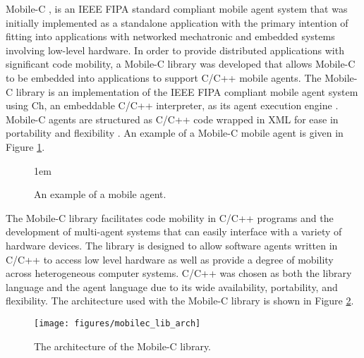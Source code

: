       Mobile-C \cite{Mobile-C,mobilec_webpage}, is an IEEE FIPA standard compliant 
        mobile agent 
        system that was initially implemented as a standalone application with the 
        primary intention of fitting into applications with networked mechatronic 
        and embedded systems involving low-level hardware.
      In order to provide distributed applications with significant code mobility, 
        a Mobile-C library \cite{Chou2007} was developed that allows Mobile-C to 
        be embedded into applications to support C/C++ mobile agents.
      The Mobile-C library is an implementation of the IEEE FIPA compliant mobile 
        agent system using Ch, an embeddable C/C++ interpreter, as its agent 
        execution engine \cite{CUJ1,embedch}.
      Mobile-C agents are structured as C/C++ code wrapped in XML for ease in 
        portability and flexibility \cite{ChenXML}.
      An example of a Mobile-C mobile agent is given in Figure \ref{fig:agentcode}.
      \begin{figure}%
        \begin{center}
        \footnotesize{\baselineskip 1em }
        \end{center}
        \caption{An example of a mobile agent.}
        \label{fig:agentcode}
      \end{figure}
      The Mobile-C library facilitates code mobility in C/C++ programs and the 
        development of multi-agent systems that can easily interface with a 
        variety of hardware devices. 
      The library is designed to allow software agents written in C/C++ to access 
        low level hardware as well as provide a degree of mobility across 
        heterogeneous computer systems. 
      C/C++ was chosen as both the library language and the agent language due to 
        its wide availability, portability, and flexibility.
      The architecture used with the Mobile-C library is shown in Figure
        \ref{fig:mobilec_lib_arch}.
      \begin{figure}%
      \centerline{\texttt{[image: figures/mobilec\_lib\_arch]}}
      \caption{The architecture of the Mobile-C library.}
      \label{fig:mobilec_lib_arch}
      \end{figure}

